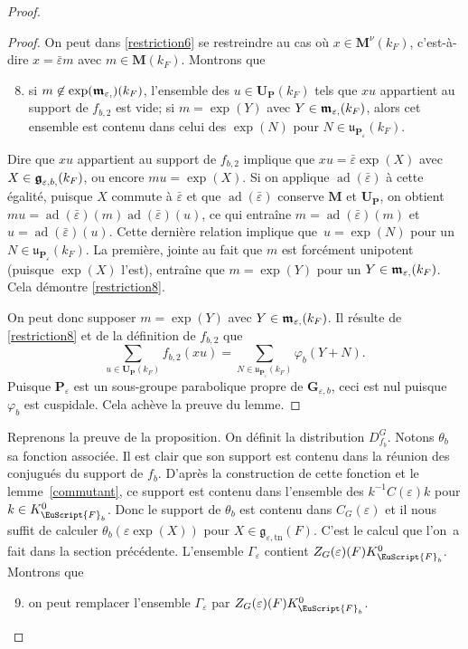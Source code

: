 \documentclass[JEP,XML,SOM,Unicode,francais]{cedram}
\let\mathcal \EuScript
\newcommand{\NoChangel}[1]{%
\expandafter\let\csname old\string#1\endcsname=#1
\let#1=\relax
\newcommand{#1}{\mathcode`l="716C\csname old\string#1\endcsname\mathcode`l="7160 }%
}
\let\epsilon\varepsilon
\newcommand{\frg}{\mathfrak{g}}
\newcommand{\mfrm}{\mathfrak{m}}
\newcommand{\fru}{\mathfrak{u}}
\newcommand{\nil}{\mathrm{nil}} \NoChangel{\nil}
\newcommand{\tn}{\mathrm{tn}}
\DeclareMathOperator{\ad}{ad}
\newcommand{\bG}{\boldsymbol{G}}
\newcommand{\bM}{\boldsymbol{M}}
\newcommand{\bP}{\boldsymbol{P}}
\newcommand{\bU}{\boldsymbol{U}}
\newcommand{\cF}{\mathcal{F}}
\theoremstyle{plain}
\theoremstyle{definition}
\begin{document}
\begin{proof}
\begin{proof}
On peut dans \eqref{restriction6} se restreindre au cas où $x\in \bM^{\nu}(k_{F})$, c'est-à-dire $x=\bar{\epsilon}m$ avec $m\in \bM(k_{F})$. Montrons que
\begin{enumerate}\setcounter{enumi}{7}
\item\label{restriction8}
si $m\not\in \exp(\boldsymbol{\mfrm}_{\epsilon,\nil})(k_{F})$, l'ensemble des $u\in \bU_{\bP}(k_{F})$ tels que $xu$ appartient au support de $f_{b,2}$ est vide; si $m=\exp(Y)$ avec $Y\in \boldsymbol{\mfrm}_{\epsilon,\nil}(k_{F})$, alors cet ensemble est contenu dans celui des $\exp(N)$ pour $N\in \boldsymbol{\fru}_{\bP_{\epsilon}}(k_{F})$.
\end{enumerate}

Dire que $xu$ appartient au support de $f_{b,2}$ implique que $xu=\bar{\epsilon} \exp(X)$ avec $X\in \boldsymbol{\frg}_{\epsilon,b,\nil}(k_{F})$, ou encore $mu=\exp(X)$. Si on applique $\ad(\bar{\epsilon})$ à cette égalité, puisque $X$ commute à $\bar{\epsilon}$ et que $\ad(\bar{\epsilon})$ conserve $\bM$ et $\bU_{\bP}$, on obtient $mu=\ad(\bar{\epsilon})(m)\ad(\bar{\epsilon})(u)$, ce qui entraîne $m=\ad(\bar{\epsilon})(m)$ et $u=\ad(\bar{\epsilon})(u)$. Cette dernière relation implique que~$u=\exp(N)$ pour un $N\in \boldsymbol{\fru}_{\bP_{\epsilon}}(k_{F})$. La première, jointe au fait que $m$ est forcément unipotent (puisque $\exp(X)$ l'est), entraîne que $m=\exp(Y)$ pour un $Y\in \boldsymbol{\mfrm}_{\epsilon,\nil}(k_{F})$. Cela démontre \eqref{restriction8}.

On peut donc supposer $m=\exp(Y)$ avec $Y\in \boldsymbol{\mfrm}_{\epsilon,\nil}(k_{F})$. Il résulte de \eqref{restriction8} et de la définition de $f_{b,2}$ que
\[
\sum_{u\in \bU_{\bP}(k_{F})}f_{b,2}(xu)=\sum_{N\in \boldsymbol{\fru}_{\bP_{\epsilon}}(k_{F}) }\varphi_{b}(Y+N).
\]
Puisque $\bP_{\epsilon}$ est un sous-groupe parabolique propre de $\bG_{\epsilon,b}$, ceci est nul puisque $\varphi_{b}$ est cuspidale. Cela achève la preuve du lemme.
\end{proof}

Reprenons la preuve de la proposition. On définit la distribution $D^G_{f_{b}}$. Notons $\theta_{b}$ sa fonction associée. Il est clair que son support est contenu dans la réunion des conjugués du support de $f_{b}$. D'après la construction de cette fonction et le lemme~\ref{commutant}, ce support est contenu dans l'ensemble des $k^{-1}C(\epsilon)k$ pour $k\in K_{\cF_{b}}^0$. Donc le support de $\theta_{b}$ est contenu dans $C_{G}(\epsilon)$ et il nous suffit de calculer $\theta_{b}(\epsilon \exp(X))$ pour $X\in \frg_{\epsilon,\tn}(F)$.
C'est le calcul que l'on~a fait dans la section précédente. L'ensemble $\Gamma_{\epsilon}$ contient $Z_{G}(\epsilon)(F)K_{\cF_{b}}^0$. Montrons que
\begin{enumerate}\setcounter{enumi}{8}
\item\label{restriction9}
on peut remplacer l'ensemble $\Gamma_{\epsilon}$ par $Z_{G}(\epsilon)(F)K_{\cF_{b}}^0$.
\end{enumerate}


\end{proof}
\end{document}
